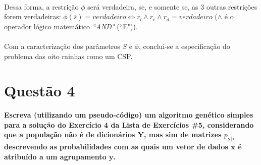 \documentclass{report}
\begin{document}
\begin{itemize}
\begin{itemize}
	\end{itemize}
	
	\paragraph{} Dessa forma, a restrição $\phi$ será verdadeira, se, e somente se, as 3 outras restrições forem verdadeiras: $\phi(\overline{s}) = verdadeiro \iff r_l \wedge r_c \wedge r_d = verdadeiro$ ($\wedge$ é o operador lógico matemático \textit{``AND"} (``E")).\\
	 
\end{itemize}

\paragraph{} Com a caracterização dos parâmetros $S$ e $\phi$, conclui-se a especificação do problema das oito rainhas como um CSP.\\

\section*{Questão 4}

\textbf{Escreva (utilizando um pseudo-código) um algoritmo genético simples para a solução do Exercício 4 da Lista de Exercícios \#5, considerando que a população não é de dicionários $\mathbf{Y}$, mas sim de matrizes $p_{\mathbf{y}|\mathbf{x}}$ descrevendo as probabilidades com as quais um vetor de dados $\mathbf{x}$ é atribuído a um agrupamento $\mathbf{y}$.}\\

\paragraph{}
\end{document}
